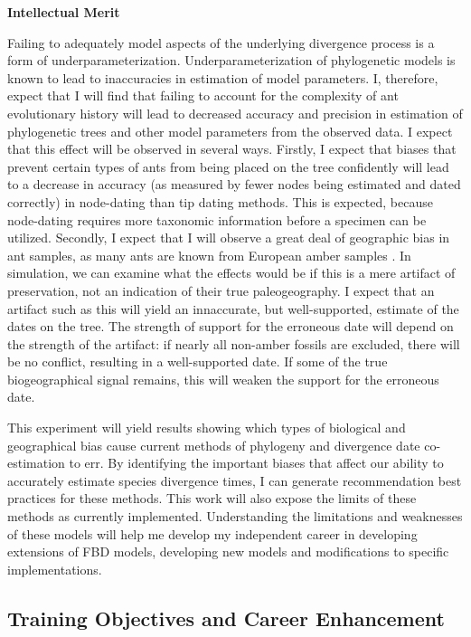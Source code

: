 \documentclass[]{article}
\begin{document}
\textbf{Intellectual Merit} \par 
Failing to adequately model aspects of the underlying divergence process is a form of underparameterization. Underparameterization of phylogenetic models is known to lead to inaccuracies in estimation of model parameters. I, therefore, expect that I will find that failing to account for the complexity of ant evolutionary history will lead to decreased accuracy and precision in estimation of phylogenetic trees and other model parameters from the observed data. I expect that this effect will be observed in several ways. Firstly, I expect that biases that prevent certain types of ants from being placed on the tree confidently will lead to a decrease in accuracy (as measured by fewer nodes being estimated and dated correctly) in node-dating than tip dating methods. This is expected, because node-dating requires more taxonomic information before a specimen can be utilized. Secondly, I expect that I will observe a great deal of geographic bias in ant samples, as many ants are known from European amber samples \citep{perrichot2008fossil}. In simulation, we can examine what the effects would be if this is a mere artifact of preservation, not an indication of their true paleogeography. I expect that an artifact such as this will yield an innaccurate, but well-supported, estimate of the dates on the tree. The strength of support for the erroneous date will depend on the strength of the artifact: if nearly all non-amber fossils are excluded, there will be no conflict, resulting in a well-supported date. If some of the true biogeographical signal remains, this will weaken the support for the erroneous date. \par
This experiment will yield results showing which types of biological and geographical bias cause current methods of phylogeny and divergence date co-estimation to err.  By identifying the important biases that affect our ability to accurately estimate species divergence times, I can generate recommendation best practices for these methods. This work will also expose the limits of these methods as currently implemented. Understanding the limitations and weaknesses of these models will help me develop my independent career in developing extensions of FBD models, developing new models and modifications to specific implementations.
\subsection*{Training Objectives and Career Enhancement}
\end{document}
